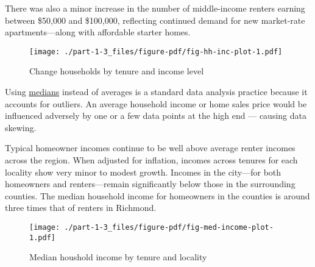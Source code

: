 \documentclass[
  letterpaper,
  DIV=11,
  numbers=noendperiod]{scrreprt}
\begin{document}
There was also a minor increase in the number of middle-income renters
earning between \$50,000 and \$100,000, reflecting continued demand for
new market-rate apartments---along with affordable starter homes.

\begin{figure}

{\centering \texttt{[image: ./part-1-3\_files/figure-pdf/fig-hh-inc-plot-1.pdf]}

}

\caption{\label{fig-hh-inc-plot}Change households by tenure and income
level}

\end{figure}

\begin{tcolorbox}[enhanced jigsaw, colframe=quarto-callout-important-color-frame, arc=.35mm, bottomrule=.15mm, colbacktitle=quarto-callout-important-color!10!white, opacityback=0, left=2mm, rightrule=.15mm, title=\textcolor{quarto-callout-important-color}{\faExclamation}\hspace{0.5em}{Why use medians}, colback=white, coltitle=black, toptitle=1mm, leftrule=.75mm, titlerule=0mm, breakable, opacitybacktitle=0.6, toprule=.15mm, bottomtitle=1mm]

Using \href{https://www.investopedia.com/terms/m/median.asp}{medians}
instead of averages is a standard data analysis practice because it
accounts for outliers. An average household income or home sales price
would be influenced adversely by one or a few data points at the high
end --- causing data skewing.

\end{tcolorbox}

Typical homeowner incomes continue to be well above average renter
incomes across the region. When adjusted for inflation, incomes across
tenures for each locality show very minor to modest growth. Incomes in
the city---for both homeowners and renters---remain significantly below
those in the surrounding counties. The median household income for
homeowners in the counties is around three times that of renters in
Richmond.

\begin{figure}

{\centering \texttt{[image: ./part-1-3\_files/figure-pdf/fig-med-income-plot-1.pdf]}

}

\caption{\label{fig-med-income-plot}Median houshold income by tenure and
locality}

\end{figure}
\end{document}
